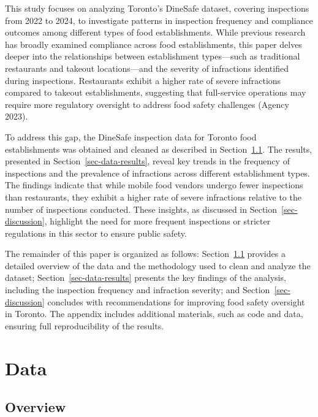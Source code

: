 \documentclass[
  letterpaper,
  DIV=11,
  numbers=noendperiod]{scrartcl}
\begin{document}
This study focuses on analyzing Toronto's DineSafe dataset, covering
inspections from 2022 to 2024, to investigate patterns in inspection
frequency and compliance outcomes among different types of food
establishments. While previous research has broadly examined compliance
across food establishments, this paper delves deeper into the
relationships between establishment types---such as traditional
restaurants and takeout locations---and the severity of infractions
identified during inspections. Restaurants exhibit a higher rate of
severe infractions compared to takeout establishments, suggesting that
full-service operations may require more regulatory oversight to address
food safety challenges (Agency 2023).

To address this gap, the DineSafe inspection data for Toronto food
establishments was obtained and cleaned as described in
Section~\ref{sec-data-overview}. The results, presented in
Section~\ref{sec-data-results}, reveal key trends in the frequency of
inspections and the prevalence of infractions across different
establishment types. The findings indicate that while mobile food
vendors undergo fewer inspections than restaurants, they exhibit a
higher rate of severe infractions relative to the number of inspections
conducted. These insights, as discussed in Section~\ref{sec-discussion},
highlight the need for more frequent inspections or stricter regulations
in this sector to ensure public safety.

The remainder of this paper is organized as follows:
Section~\ref{sec-data-overview} provides a detailed overview of the data
and the methodology used to clean and analyze the dataset;
Section~\ref{sec-data-results} presents the key findings of the
analysis, including the inspection frequency and infraction severity;
and Section~\ref{sec-discussion} concludes with recommendations for
improving food safety oversight in Toronto. The appendix includes
additional materials, such as code and data, ensuring full
reproducibility of the results.

\section{Data}\label{sec-data}

\subsection{Overview}\label{sec-data-overview}
\end{document}
